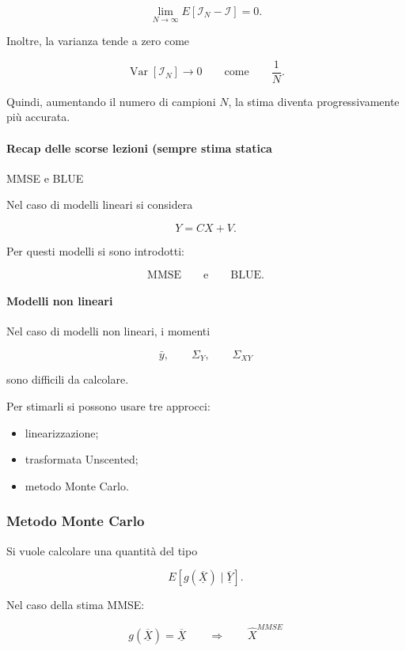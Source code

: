 \documentclass[11pt,a4paper]{article}
\begin{document}
\[
\lim_{N\to\infty} E[\mathcal{I}_N-\mathcal{I}]=0.
\]

Inoltre, la varianza tende a zero come

\[
\operatorname{Var}[\mathcal{I}_N]\to 0
\qquad \text{come} \qquad
\frac{1}{N}.
\]

Quindi, aumentando il numero di campioni \(N\), la stima diventa progressivamente più accurata.

\paragraph{Recap delle scorse lezioni (sempre stima statica} 

MMSE e BLUE

Nel caso di modelli lineari si considera

\[
Y=CX+V.
\]

Per questi modelli si sono introdotti:

\[
\mathrm{MMSE}
\qquad \text{e} \qquad
\mathrm{BLUE}.
\]

\paragraph{Modelli non lineari}

Nel caso di modelli non lineari, i momenti

\[
\bar y,
\qquad
\Sigma_Y,
\qquad
\Sigma_{XY}
\]

sono difficili da calcolare.

Per stimarli si possono usare tre approcci:

\begin{itemize}
    \item linearizzazione;
    \item trasformata Unscented;
    \item metodo Monte Carlo.
\end{itemize}

\subsubsection*{Metodo Monte Carlo}

Si vuole calcolare una quantità del tipo

\[
E[g(\overline{\underline{X}})\mid \overline{\underline{Y}}].
\]

Nel caso della stima MMSE:

\[
g(\overline{\underline{X}})=\overline{\underline{X}}
\qquad \Rightarrow \qquad \hat X^{MMSE}
\]
\end{document}
